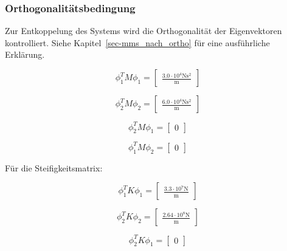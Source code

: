 \documentclass[
  letterpaper,
  DIV=11]{scrreprt}
\begin{document}
\hypertarget{orthogonalituxe4tsbedingung}{%
\subsubsection{Orthogonalitätsbedingung}\label{orthogonalituxe4tsbedingung}}

Zur Entkoppelung des Systems wird die Orthogonalität der Eigenvektoren
kontrolliert. Siehe Kapitel~\ref{sec-mms_nach_ortho} für eine
ausführliche Erklärung.

\begin{equation}\phi_{1}^{T} M \phi_{1} = \left[\begin{matrix}\frac{3.0 \cdot 10^{4} \text{N} \text{s}^{2}}{\text{m}}\end{matrix}\right]\end{equation}

\begin{equation}\phi_{2}^{T} M \phi_{2} = \left[\begin{matrix}\frac{6.0 \cdot 10^{4} \text{N} \text{s}^{2}}{\text{m}}\end{matrix}\right]\end{equation}

\begin{equation}\phi_{2}^{T} M \phi_{1} = \left[\begin{matrix}0\end{matrix}\right]\end{equation}

\begin{equation}\phi_{1}^{T} M \phi_{2} = \left[\begin{matrix}0\end{matrix}\right]\end{equation}

Für die Steifigkeitsmatrix:

\begin{equation}\phi_{1}^{T} K \phi_{1} = \left[\begin{matrix}\frac{3.3 \cdot 10^{7} \text{N}}{\text{m}}\end{matrix}\right]\end{equation}

\begin{equation}\phi_{2}^{T} K \phi_{2} = \left[\begin{matrix}\frac{2.64 \cdot 10^{8} \text{N}}{\text{m}}\end{matrix}\right]\end{equation}

\begin{equation}\phi_{2}^{T} K \phi_{1} = \left[\begin{matrix}0\end{matrix}\right]\end{equation}
\end{document}
